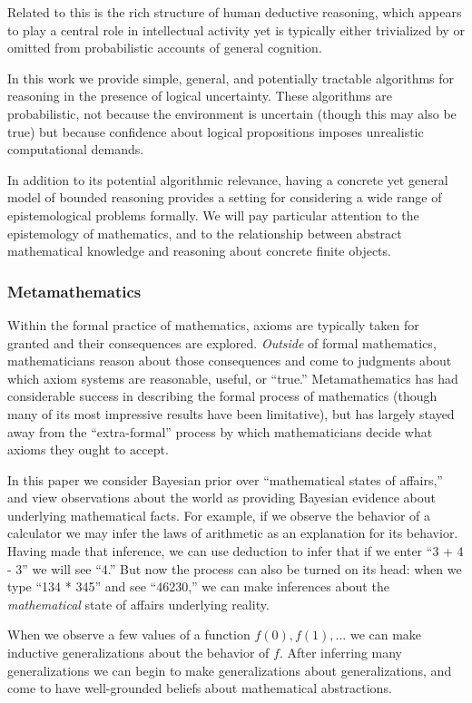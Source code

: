 \documentclass[12pt]{article}
\theoremstyle{definition}
\begin{document}
Related to this is the rich structure of human deductive reasoning,
which appears to play a central role in intellectual activity
yet is typically either trivialized by or omitted from probabilistic accounts
of general cognition.

In this work we provide simple, general, and potentially tractable
algorithms for reasoning in the presence
of logical uncertainty.
These algorithms are probabilistic,
not because the environment is uncertain (though this may also be true)
but because confidence about logical propositions imposes unrealistic
computational demands.

In addition to its potential algorithmic relevance,
having a concrete yet general model of bounded reasoning
provides a setting for considering a wide range
of epistemological problems formally.
We will pay particular attention to
the epistemology of mathematics, and to
the relationship between abstract mathematical knowledge
and reasoning about concrete finite objects.

\subsubsection{Metamathematics}

Within the formal practice of mathematics, 
axioms are typically taken for granted
and their consequences are explored.
\emph{Outside} of formal mathematics,
mathematicians reason about those consequences and come
to judgments about which axiom systems are reasonable, useful, or ``true.''
Metamathematics has had considerable success in describing
the formal process of mathematics (though many of its most
impressive results have been limitative),
but has largely stayed away from the ``extra-formal'' process
by which mathematicians decide what axioms they ought to accept.

In this paper we 
consider Bayesian prior over 
``mathematical states of affairs,''
and view observations about the world as providing
Bayesian evidence about underlying mathematical facts.
For example, if we observe the behavior of a calculator
we may infer the laws of arithmetic as an explanation for its behavior.
Having made that inference, we can use deduction
to infer that if we enter ``3 + 4 - 3'' we will see ``4.''
But now the process can also be turned on its head:
when we type ``134 * 345'' and see ``46230,''
we can make inferences about the \emph{mathematical} state of affairs
underlying reality.

When we observe
a few values of a function $f(0), f(1), \ldots$
we can make inductive generalizations about the behavior of $f$.
After inferring many generalizations
we can begin to make generalizations about generalizations,
and come to have well-grounded beliefs
about mathematical abstractions.
\end{document}
